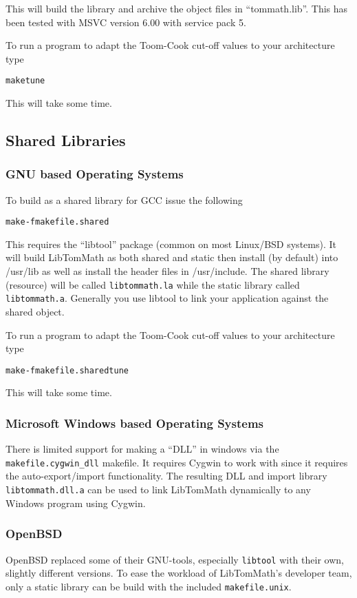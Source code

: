 \documentclass[synpaper]{book}
\begin{document}
This will build the library and archive the object files in ``tommath.lib''.  This has been tested with MSVC
version 6.00 with service pack 5.

To run a program to adapt the Toom-Cook cut-off values to your architecture type
\begin{alltt}
make tune
\end{alltt}
This will take some time.

\subsection{Shared Libraries}
\subsubsection{GNU based Operating Systems}
To build as a shared library for GCC issue the following
\begin{alltt}
make -f makefile.shared
\end{alltt}
This requires the ``libtool'' package (common on most Linux/BSD systems).  It will build LibTomMath as both shared
and static then install (by default) into /usr/lib as well as install the header files in /usr/include.  The shared
library (resource) will be called \texttt{libtommath.la} while the static library called \texttt{libtommath.a}.  Generally
you use libtool to link your application against the shared object.

To run a program to adapt the Toom-Cook cut-off values to your architecture type
\begin{alltt}
make -f makefile.shared tune
\end{alltt}
This will take some time.

\subsubsection{Microsoft Windows based Operating Systems}
There is limited support for making a ``DLL'' in windows via the \texttt{makefile.cygwin\_dll} makefile.  It requires
Cygwin to work with since it requires the auto-export/import functionality.  The resulting DLL and import library
\texttt{libtommath.dll.a} can be used to link LibTomMath dynamically to any Windows program using Cygwin.
\subsubsection{OpenBSD}
OpenBSD replaced some of their GNU-tools, especially \texttt{libtool} with their own, slightly different versions. To ease the workload of LibTomMath's developer team, only a static library can be build with the included \texttt{makefile.unix}.
\end{document}
